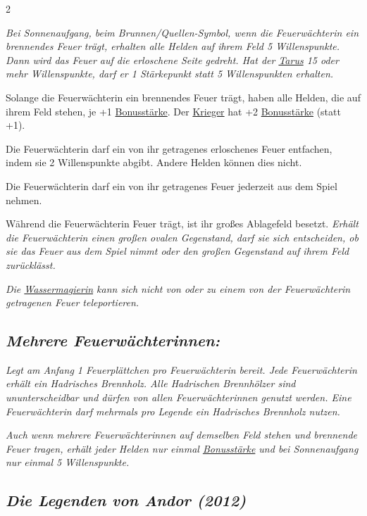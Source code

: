 \documentclass[10pt, a4paper, oneside]{book}
\newcommand{\fan}[1]{\textit{#1}}
\begin{document}
\begin{multicols*}{2}
\begin{nobgcolor}
\fan{Bei Sonnenaufgang, beim Brunnen/Quellen-Symbol, wenn die Feuerwächterin ein brennendes Feuer trägt, erhalten alle Helden auf ihrem Feld 5 Willenspunkte. Dann wird das Feuer auf die erloschene Seite gedreht. Hat der \hyperref[tarus]{Tarus} 15 oder mehr Willenspunkte, darf er 1 Stärkepunkt statt 5 Willenspunkten erhalten.} 

Solange die Feuerwächterin ein brennendes Feuer trägt, haben alle Helden, die auf ihrem Feld stehen, je +1 \hyperref[bonusstaerke]{Bonusstärke}. Der \hyperref[krieger]{Krieger} hat +2 \hyperref[bonusstaerke]{Bonusstärke} (statt +1).
\supercite{dek-begleitheft} 

Die Feuerwächterin darf ein von ihr getragenes erloschenes Feuer entfachen, indem sie 2 Willenspunkte abgibt.\supercite{dek-begleitheft} Andere Helden können dies nicht.\supercite{105294}

Die Feuerwächterin darf ein von ihr getragenes Feuer jederzeit aus dem Spiel nehmen.
\supercite{117803}

Während die Feuerwächterin Feuer trägt, ist ihr großes Ablagefeld besetzt. \fan{Erhält die Feuerwächterin einen großen ovalen Gegenstand, darf sie sich entscheiden, ob sie das Feuer aus dem Spiel nimmt oder den großen Gegenstand auf ihrem Feld zurücklässt.}

\fan{Die \hyperref[wassermagierin]{Wassermagierin} kann sich nicht von oder zu einem von der Feuerwächterin getragenen Feuer teleportieren.}


\columnbreak
\subsection{\fan{Mehrere Feuerwächterinnen:}}

\fan{Legt am Anfang 1 Feuerplättchen pro Feuerwächterin bereit. Jede Feuerwächterin erhält ein Hadrisches Brennholz. Alle Hadrischen Brennhölzer sind ununterscheidbar und dürfen von allen Feuerwächterinnen genutzt werden. Eine Feuerwächterin darf mehrmals pro Legende ein Hadrisches Brennholz nutzen.}

\fan{Auch wenn mehrere Feuerwächterinnen auf demselben Feld stehen und brennende Feuer tragen, erhält jeder Helden nur einmal \hyperref[bonusstaerke]{Bonusstärke} und bei Sonnenaufgang nur einmal 5 Willenspunkte.}


\end{nobgcolor}


\begin{bgcolor}
\section{\fan{Die Legenden von Andor (2012)}}


\end{bgcolor}
\end{multicols*}
\end{document}
